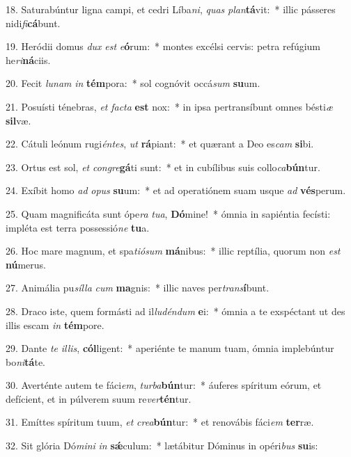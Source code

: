 18. Saturabúntur ligna campi, et cedri Líba\textit{ni}, \textit{quas} \textit{plan}\textbf{tá}vit:~*  illic pásseres nidi\textit{fi}\textbf{cá}bunt.\

19. Heródii domus \textit{dux} \textit{est} \textit{e}\textbf{ó}rum:~*  montes excélsi cervis: petra refúgium he\textit{ri}\textbf{ná}ciis.\

20. Fecit \textit{lu}\textit{nam} \textit{in} \textbf{tém}pora:~*  sol cognóvit occá\textit{sum} \textbf{su}um.\

21. Posuísti ténebras, \textit{et} \textit{fac}\textit{ta} \textbf{est} nox:~*  in ipsa pertransíbunt omnes bésti\textit{æ} \textbf{sil}væ.\

22. Cátuli leónum rugi\textit{én}\textit{tes}, \textit{ut} \textbf{rá}piant:~*  et quærant a Deo es\textit{cam} \textbf{si}bi.\

23. Ortus est sol, \textit{et} \textit{con}\textit{gre}\textbf{gá}ti sunt:~*  et in cubílibus suis collo\textit{ca}\textbf{bún}tur.\

24. Exíbit homo \textit{ad} \textit{o}\textit{pus} \textbf{su}um:~*  et ad operatiónem suam usque \textit{ad} \textbf{vés}perum.\

25. Quam magnificáta sunt ópe\textit{ra} \textit{tu}\textit{a}, \textbf{Dó}mine!~*  ómnia in sapiéntia fecísti: impléta est terra possessió\textit{ne} \textbf{tu}a.\

26. Hoc mare magnum, et spa\textit{ti}\textit{ó}\textit{sum} \textbf{má}nibus:~*  illic reptília, quorum non \textit{est} \textbf{nú}merus.\

27. Animália pu\textit{síl}\textit{la} \textit{cum} \textbf{ma}gnis:~*  illic naves per\textit{trans}\textbf{í}bunt.\

28. Draco iste, quem formásti ad il\textit{lu}\textit{dén}\textit{dum} \textbf{e}i:~*  ómnia a te exspéctant ut des illis escam \textit{in} \textbf{tém}pore.\

29. Dante \textit{te} \textit{il}\textit{lis}, \textbf{cól}ligent:~*  aperiénte te manum tuam, ómnia implebúntur bo\textit{ni}\textbf{tá}te.\

30. Averténte autem te fáci\textit{em}, \textit{tur}\textit{ba}\textbf{bún}tur:~*  áuferes spíritum eórum, et defícient, et in púlverem suum re\textit{ver}\textbf{tén}tur.\

31. Emíttes spíritum tuum, \textit{et} \textit{cre}\textit{a}\textbf{bún}tur:~*  et renovábis fáci\textit{em} \textbf{ter}ræ.\

32. Sit glória Dó\textit{mi}\textit{ni} \textit{in} \textbf{sǽ}culum:~*  lætábitur Dóminus in opéri\textit{bus} \textbf{su}is:\

